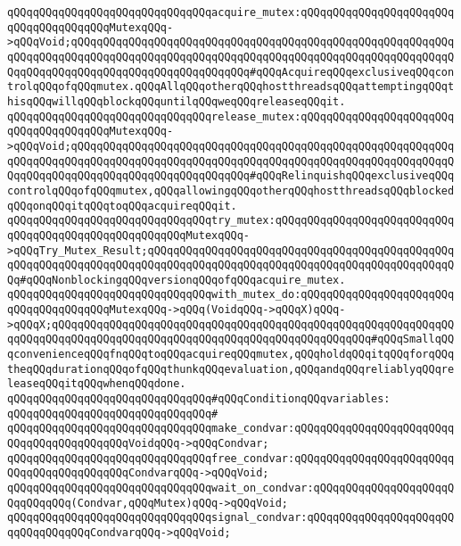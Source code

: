 \verb|qQQqqQQqqQQqqQQqqQQqqQQqqQQqqQQqacquire_mutex:qQQqqQQqqQQqqQQqqQQqqQQqqQQqqQQqqQQqqQQqMutexqQQq->qQQqVoid;qQQqqQQqqQQqqQQqqQQqqQQqqQQqqQQqqQQqqQQqqQQqqQQqqQQqqQQqqQQqqQQqqQQqqQQqqQQqqQQqqQQqqQQqqQQqqQQqqQQqqQQqqQQqqQQqqQQqqQQqqQQqqQQqqQQqqQQqqQQqqQQqqQQqqQQqqQQqqQQqqQQqqQQq#qQQqAcquireqQQqexclusiveqQQqcontrolqQQqofqQQqmutex.qQQqAllqQQqotherqQQqhostthreadsqQQqattemptingqQQqthisqQQqwillqQQqblockqQQquntilqQQqweqQQqreleaseqQQqit.|\newline
\verb|qQQqqQQqqQQqqQQqqQQqqQQqqQQqqQQqrelease_mutex:qQQqqQQqqQQqqQQqqQQqqQQqqQQqqQQqqQQqqQQqMutexqQQq->qQQqVoid;qQQqqQQqqQQqqQQqqQQqqQQqqQQqqQQqqQQqqQQqqQQqqQQqqQQqqQQqqQQqqQQqqQQqqQQqqQQqqQQqqQQqqQQqqQQqqQQqqQQqqQQqqQQqqQQqqQQqqQQqqQQqqQQqqQQqqQQqqQQqqQQqqQQqqQQqqQQqqQQqqQQqqQQq#qQQqRelinquishqQQqexclusiveqQQqcontrolqQQqofqQQqmutex,qQQqallowingqQQqotherqQQqhostthreadsqQQqblockedqQQqonqQQqitqQQqtoqQQqacquireqQQqit.|\newline
\verb|qQQqqQQqqQQqqQQqqQQqqQQqqQQqqQQqtry_mutex:qQQqqQQqqQQqqQQqqQQqqQQqqQQqqQQqqQQqqQQqqQQqqQQqqQQqqQQqMutexqQQq->qQQqTry_Mutex_Result;qQQqqQQqqQQqqQQqqQQqqQQqqQQqqQQqqQQqqQQqqQQqqQQqqQQqqQQqqQQqqQQqqQQqqQQqqQQqqQQqqQQqqQQqqQQqqQQqqQQqqQQqqQQqqQQqqQQqqQQq#qQQqNonblockingqQQqversionqQQqofqQQqacquire_mutex.|\newline
\verb|qQQqqQQqqQQqqQQqqQQqqQQqqQQqqQQqwith_mutex_do:qQQqqQQqqQQqqQQqqQQqqQQqqQQqqQQqqQQqqQQqMutexqQQq->qQQq(VoidqQQq->qQQqX)qQQq->qQQqX;qQQqqQQqqQQqqQQqqQQqqQQqqQQqqQQqqQQqqQQqqQQqqQQqqQQqqQQqqQQqqQQqqQQqqQQqqQQqqQQqqQQqqQQqqQQqqQQqqQQqqQQqqQQqqQQqqQQqqQQq#qQQqSmallqQQqconvenienceqQQqfnqQQqtoqQQqacquireqQQqmutex,qQQqholdqQQqitqQQqforqQQqtheqQQqdurationqQQqofqQQqthunkqQQqevaluation,qQQqandqQQqreliablyqQQqreleaseqQQqitqQQqwhenqQQqdone.|\newline
\newline
\verb|qQQqqQQqqQQqqQQqqQQqqQQqqQQqqQQq#qQQqConditionqQQqvariables:|\newline
\verb|qQQqqQQqqQQqqQQqqQQqqQQqqQQqqQQq#|\newline
\verb|qQQqqQQqqQQqqQQqqQQqqQQqqQQqqQQqmake_condvar:qQQqqQQqqQQqqQQqqQQqqQQqqQQqqQQqqQQqqQQqqQQqVoidqQQq->qQQqCondvar;|\newline
\verb|qQQqqQQqqQQqqQQqqQQqqQQqqQQqqQQqfree_condvar:qQQqqQQqqQQqqQQqqQQqqQQqqQQqqQQqqQQqqQQqqQQqCondvarqQQq->qQQqVoid;|\newline
\verb|qQQqqQQqqQQqqQQqqQQqqQQqqQQqqQQqwait_on_condvar:qQQqqQQqqQQqqQQqqQQqqQQqqQQqqQQq(Condvar,qQQqMutex)qQQq->qQQqVoid;|\newline
\verb|qQQqqQQqqQQqqQQqqQQqqQQqqQQqqQQqsignal_condvar:qQQqqQQqqQQqqQQqqQQqqQQqqQQqqQQqqQQqCondvarqQQq->qQQqVoid;|\newline
